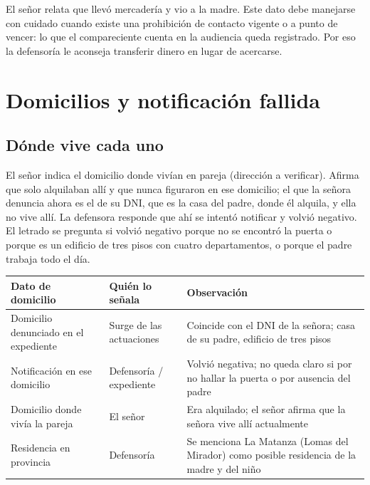 \documentclass[12pt,oneside]{book}
\begin{document}
\begin{important}
El se\~nor relata que llev\'o mercader\'ia y vio a la madre. Este dato debe manejarse con cuidado cuando existe una prohibici\'on de contacto vigente o a punto de vencer: lo que el compareciente cuenta en la audiencia queda registrado. Por eso la defensor\'ia le aconseja transferir dinero en lugar de acercarse.
\end{important}

\section{Domicilios y notificaci\'on fallida}

\subsection{D\'onde vive cada uno}

El se\~nor indica el domicilio donde viv\'ian en pareja (direcci\'on a verificar). %
Afirma que solo alquilaban all\'i y que nunca figuraron en ese domicilio; el que la se\~nora denuncia ahora es el de su DNI, que es la casa del padre, donde \'el alquila, y ella no vive all\'i. La defensora responde que ah\'i se intent\'o notificar y volvi\'o negativo. El letrado se pregunta si volvi\'o negativo porque no se encontr\'o la puerta o porque es un edificio de tres pisos con cuatro departamentos, o porque el padre trabaja todo el d\'ia.

\begin{table}[H]
\centering
\small
\begin{tabularx}{\textwidth}{>{\raggedright\arraybackslash}p{} >{\raggedright\arraybackslash}p{} >{\raggedright\arraybackslash}X}
\toprule
\textbf{Dato de domicilio} & \textbf{Qui\'en lo se\~nala} & \textbf{Observaci\'on} \\
\midrule
Domicilio denunciado en el expediente & Surge de las actuaciones & Coincide con el DNI de la se\~nora; casa de su padre, edificio de tres pisos \\
Notificaci\'on en ese domicilio & Defensor\'ia / expediente & Volvi\'o negativa; no queda claro si por no hallar la puerta o por ausencia del padre \\
Domicilio donde viv\'ia la pareja & El se\~nor & Era alquilado; el se\~nor afirma que la se\~nora vive all\'i actualmente \\
Residencia en provincia & Defensor\'ia & Se menciona La Matanza (Lomas del Mirador) como posible residencia de la madre y del ni\~no \\
\bottomrule
\end{tabularx}
\end{table}
\end{document}
